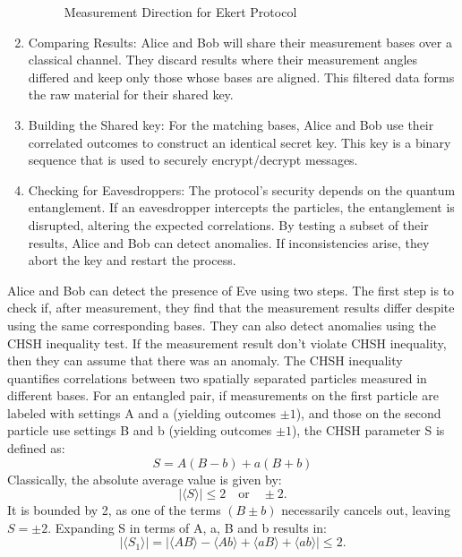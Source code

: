 \documentclass[a4paper]{cas-sc}
\begin{document}
\begin{enumerate}
          \begin{figure}[pos=h]
              \centering
              
              \caption{Measurement Direction for Ekert Protocol}
              \label{fig:mesurement_direction}
          \end{figure}

    \item Comparing Results:  Alice and Bob will share their measurement bases over a classical channel. They discard results where their measurement angles differed and keep only those whose bases are aligned. This filtered data forms the raw material for their shared key.
    \item Building the Shared key: For the matching bases, Alice and Bob use their correlated outcomes to construct an identical secret key. This key is a binary sequence that is used to securely encrypt/decrypt messages.
    \item Checking for Eavesdroppers: The protocol's security depends on the quantum entanglement. If an eavesdropper intercepts the particles, the entanglement is disrupted, altering the expected correlations. By testing a subset of their results, Alice and Bob can detect anomalies. If inconsistencies arise, they abort the key and restart the process.
\end{enumerate}

Alice and Bob can detect the presence of Eve using two steps. The first step is to check if, after measurement, they find that the measurement results differ despite using the same corresponding bases. They can also detect anomalies using the CHSH inequality test. If the measurement result don't violate CHSH inequality, then they can assume that there was an anomaly.
The CHSH inequality quantifies correlations between two spatially separated particles measured in different bases. For an entangled pair, if measurements on the first particle are labeled with settings A and a (yielding outcomes $ \pm 1 $), and those on the second particle use settings B and b (yielding outcomes $ \pm 1 $), the CHSH parameter S is defined as:
\begin{equation}
    S = A(B - b) + a(B + b)
\end{equation}
Classically, the absolute average value is given by:
\[
    |\langle S \rangle| \leq 2 \quad \text{or} \quad \pm 2.
\]
It is bounded by 2, as one of the terms \( (B \pm b) \) necessarily cancels out, leaving \( S = \pm 2 \).
Expanding S in terms of A, a, B and b results in:
\[
    \left| \langle S_1 \rangle \right| = \left| \langle AB \rangle - \langle Ab \rangle + \langle aB \rangle + \langle ab \rangle \right| \leq 2.
\]
\end{document}
